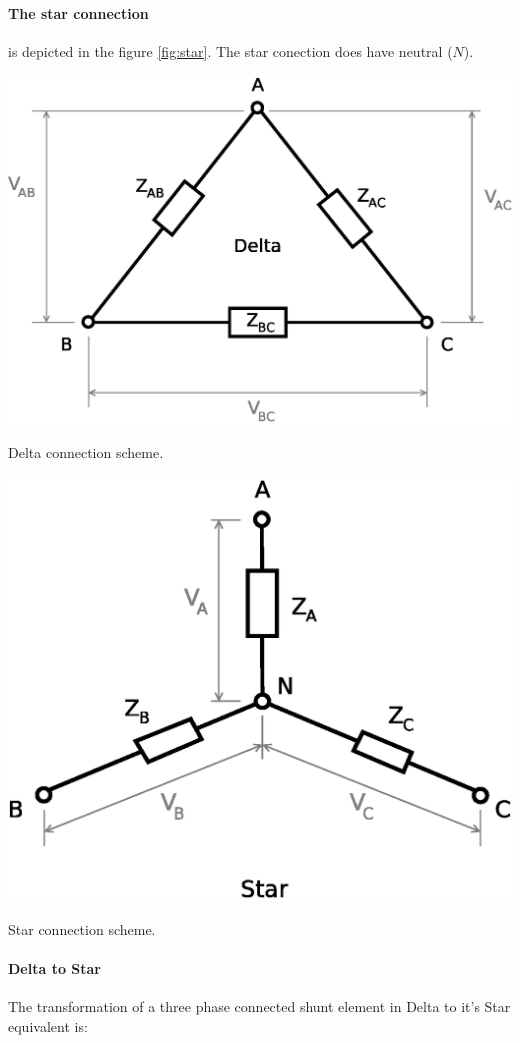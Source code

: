\documentclass{tufte-book}
\begin{document}
\paragraph{The star connection} is depicted in the figure \ref{fig:star}. The star conection does have neutral ($N$). 

\begin{marginfigure}
  \includegraphics[width=0.9\linewidth]{img/Delta.eps}
  \caption{Delta connection scheme.}
  \label{fig:delta}
\end{marginfigure}

\begin{marginfigure}
  \includegraphics[width=0.9\linewidth]{img/Star.eps}
  \caption{Star connection scheme.}
  \label{fig:star}
\end{marginfigure}

\paragraph{Delta to Star} The transformation of a three phase connected shunt element in Delta to it's Star equivalent is:
\end{document}
